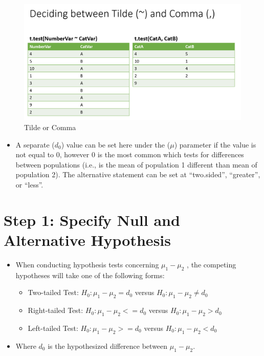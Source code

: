 \documentclass[
  letterpaper,
  DIV=11,
  numbers=noendperiod]{scrreprt}
\providecommand{\tightlist}{%
  \setlength{\itemsep}{0pt}\setlength{\parskip}{0pt}}\usepackage{longtable,booktabs,array}
\begin{document}
\begin{figure}[H]

{\centering \includegraphics{Pictures/Ch6/Tilde.png}

}

\caption{Tilde or Comma}

\end{figure}%

\begin{itemize}
\tightlist
\item
  A separate (\(d_0\)) value can be set here under the (\(\mu\))
  parameter if the value is not equal to 0, however 0 is the most common
  which tests for differences between populations (i.e., is the mean of
  population 1 different than mean of population 2). The alternative
  statement can be set at ``two.sided'', ``greater'', or ``less''.
\end{itemize}

\section{Step 1: Specify Null and Alternative
Hypothesis}\label{step-1-specify-null-and-alternative-hypothesis-1}

\begin{itemize}
\tightlist
\item
  When conducting hypothesis tests concerning \(\mu_1  - \mu_2\) , the
  competing hypotheses will take one of the following forms:

  \begin{itemize}
  \tightlist
  \item
    Two-tailed Test: \(H_0: \mu_1  - \mu_2 =  d_0\) versus
    \(H_0: \mu_1  - \mu_2 \neq  d_0\)
  \item
    Right-tailed Test: \(H_0: \mu_1  - \mu_2 <=  d_0\) versus
    \(H_0: \mu_1  - \mu_2 >  d_0\)
  \item
    Left-tailed Test: \(H_0: \mu_1  - \mu_2 >=  d_0\) versus
    \(H_0: \mu_1  - \mu_2 <  d_0\)
  \end{itemize}
\item
  Where \(d_0\) is the hypothesized difference between
  \(\mu_1  - \mu_2\).
\end{itemize}
\end{document}
